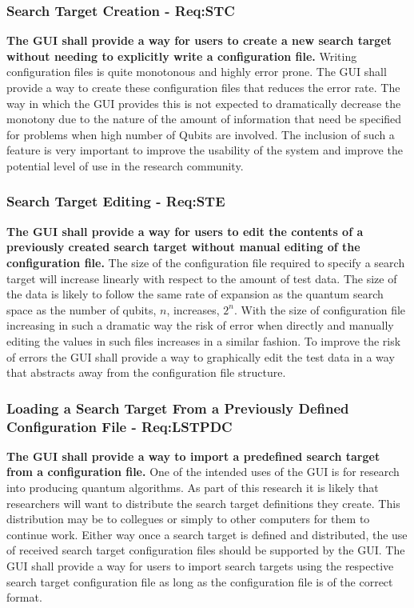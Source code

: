 \subsubsection{Search Target Creation - Req:STC}
\label{sec:reqstc}
\textbf{The GUI shall provide a way for users to create a new search target without needing to explicitly write a configuration file.}
Writing configuration files is quite monotonous and highly error prone.
The GUI shall provide a way to create these configuration files that reduces the error rate.
The way in which the GUI provides this is not expected to dramatically decrease the monotony due to the nature of the amount of information that need be specified for problems when high number of Qubits are involved.
The inclusion of such a feature is very important to improve the usability of the system and improve the potential level of use in the research community.

\subsubsection{Search Target Editing - Req:STE}
\label{sec:reqste}
\textbf{The GUI shall provide a way for users to edit the contents of a previously created search target without manual editing of the configuration file.}
The size of the configuration file required to specify a search target will increase linearly with respect to the amount of test data.
The size of the data is likely to follow the same rate of expansion as the quantum search space as the number of qubits, $n$, increases, $2^n$.
With the size of configuration file increasing in such a dramatic way the risk of error when directly and manually editing the values in such files increases in a similar fashion.
To improve the risk of errors the GUI shall provide a way to graphically edit the test data in a way that abstracts away from the configuration file structure.

\subsubsection{Loading a Search Target From a Previously Defined Configuration File - Req:LSTPDC}
\label{sec:reqlstpdc}
\textbf{The GUI shall provide a way to import a predefined search target from a configuration file.}
One of the intended uses of the GUI is for research into producing quantum algorithms.
As part of this research it is likely that researchers will want to distribute the search target definitions they create.
This distribution may be to collegues or simply to other computers for them to continue work.
Either way once a search target is defined and distributed, the use of received search target configuration files should be supported by the GUI.
The GUI shall provide a way for users to import search targets using the respective search target configuration file as long as the configuration file is of the correct format.

